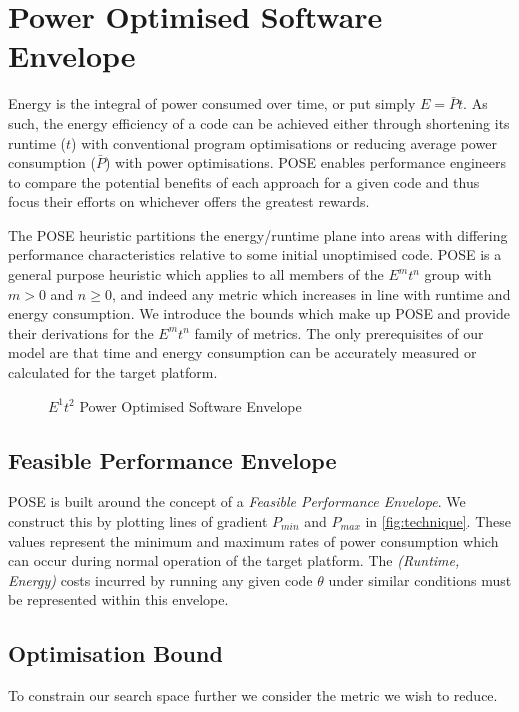 \section{Power Optimised Software Envelope}
\label{sec:pose}
\noindent
Energy is the integral of power consumed over time, or put simply $E = \bar{P}t$.
As such, the energy efficiency of a code can be achieved either through shortening its runtime ($t$) with conventional program optimisations or reducing average power consumption ($\bar{P}$) with power optimisations.
POSE enables performance engineers to compare the potential benefits of each approach for a given code and thus focus their efforts on whichever offers the greatest rewards.

The POSE heuristic partitions the energy/runtime plane into areas with differing performance characteristics relative to some initial unoptimised code.
POSE is a general purpose heuristic which applies to all members of the $E^mt^n$ group with $m > 0$ and $n \geq 0$, and indeed any metric which increases in line with runtime and energy consumption.
We introduce the bounds which make up POSE and provide their derivations for the $E^mt^n$ family of metrics.
The only prerequisites of our model are that time and energy consumption can be accurately measured or calculated for the target platform.

\begin{figure}
\scriptsize
\centering

\caption{$E^1t^2$ Power Optimised Software Envelope}
\label{fig:technique}
\end{figure}

\subsection{Feasible Performance Envelope}
\noindent
POSE is built around the concept of a \emph{Feasible Performance Envelope}.
We construct this by plotting lines of gradient $P_{min}$ and $P_{max}$ in \autoref{fig:technique}.
These values represent the minimum and maximum rates of power consumption which can occur during normal operation of the target platform.
The \textit{(Runtime, Energy)} costs incurred by running any given code $\theta$ under similar conditions must be represented within this envelope.

\subsection{Optimisation Bound}
\noindent
To constrain our search space further we consider the metric we wish to reduce.

